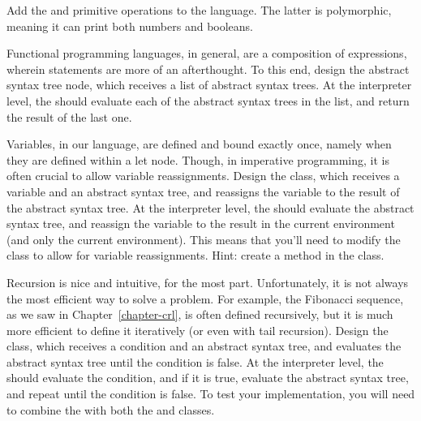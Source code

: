 Add the  and  primitive operations to the language. The latter is polymorphic, meaning it can print both numbers and booleans.

Functional programming languages, in general, are a composition of expressions, wherein statements are more of an afterthought. To this end, design the  abstract syntax tree node, which receives a list of abstract syntax trees. At the interpreter level, the  should evaluate each of the abstract syntax trees in the list, and return the result of the last one.

Variables, in our language, are defined and bound exactly once, namely when they are defined within a let node. Though, in imperative programming, it is often crucial to allow variable reassignments. Design the  class, which receives a variable and an abstract syntax tree, and reassigns the variable to the result of the abstract syntax tree. At the interpreter level, the  should evaluate the abstract syntax tree, and reassign the variable to the result in the current environment (and only the current environment). This means that you'll need to modify the  class to allow for variable reassignments. Hint: create a  method in the  class.

 Recursion is nice and intuitive, for the most part. Unfortunately, it is not always the most efficient way to solve a problem. For example, the Fibonacci sequence, as we saw in Chapter~\ref{chapter-crl}, is often defined recursively, but it is much more efficient to define it iteratively (or even with tail recursion). Design the  class, which receives a condition and an abstract syntax tree, and evaluates the abstract syntax tree until the condition is false. At the interpreter level, the  should evaluate the condition, and if it is true, evaluate the abstract syntax tree, and repeat until the condition is false. To test your implementation, you will need to combine the  with both the  and  classes.

